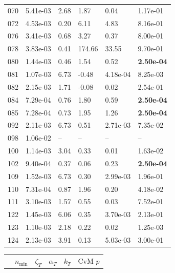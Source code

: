 \begin{figure}[htbp!]
{\begin{minipage}[t]{0.48\linewidth}
\begin{tabular}{llllll}
                    070 & 5.41e-03 & 2.68 & 1.87 & 0.04 & 1.17e-01\\
                    072 & 4.53e-03 & 0.20 & 6.11 & 4.83 & 8.16e-01\\
                    076 & 3.41e-03 & 0.68 & 3.27 & 0.37 & 8.00e-01\\
                    078 & 3.83e-03 & 0.41 & 174.66 & 33.55 & 9.70e-01\\
                    080 & 1.44e-03 & 0.46 & 1.54 & 0.52 & \textbf{2.50e-04}\\
                    081 & 1.07e-03 & 6.73 & -0.48 & 4.18e-04 & 8.25e-03\\
                    082 & 2.15e-03 & 1.71 & -0.08 & 0.02 & 2.54e-01\\
                    084 & 7.29e-04 & 0.76 & 1.80 & 0.59 & \textbf{2.50e-04}\\
                    085 & 7.28e-04 & 0.73 & 1.95 & 1.26 & \textbf{2.50e-04}\\
                    092 & 2.11e-03 & 6.73 & 0.51 & 2.71e-03 & 7.35e-02\\
                    098 & 1.06e-02 & -- & -- & -- & --\\
                    100 & 1.14e-03 & 3.04 & 0.33 & 0.01 & 1.63e-02\\
                    102 & 9.40e-04 & 0.37 & 0.06 & 0.23 & \textbf{2.50e-04}\\
                    109 & 1.52e-03 & 6.73 & 0.30 & 2.99e-03 & 1.96e-01\\
                    110 & 7.31e-04 & 0.87 & 1.96 & 0.20 & 4.18e-02\\
                    111 & 3.10e-03 & 1.57 & 0.55 & 0.03 & 7.52e-01\\
                    122 & 1.45e-03 & 6.06 & 0.35 & 3.70e-03 & 2.13e-01\\
                    123 & 1.10e-03 & 2.18 & 0.22 & 0.02 & 1.25e-03\\
                    124 & 2.13e-03 & 3.91 & 0.13 & 5.03e-03 & 3.00e-01\\
        \bottomrule
        \end{tabular}
    \end{minipage}
    \hspace{0.02\linewidth}
    \begin{minipage}[t]{0.48\linewidth}
        \centering
        \begin{tabular}{llllll}
        \toprule
         & $n_{\min}$ & $\zeta_T$ & $\alpha_T$ & $k_T$ & CvM $p$ \\

\end{tabular}
\end{minipage}}
\end{figure}
